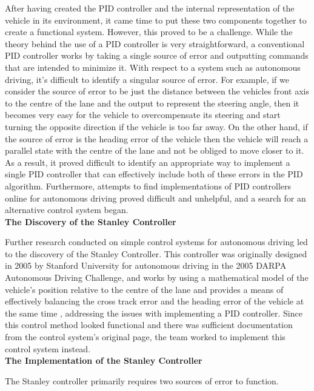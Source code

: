 \documentclass[titlepage, draft]{article}
\begin{document}
{After having created the PID controller and the internal representation of the vehicle in its environment, it came time to put these two components together to create a functional system. However, this proved to be a challenge. While the theory behind the use of a PID controller is very straightforward, a conventional PID controller works by taking a single source of error and outputting commands that are intended to minimize it. With respect to a system such as autonomous driving, it's difficult to identify a singular source of error. For example, if we consider the source of error to be just the distance between the vehicles front axis to the centre of the lane and the output to represent the steering angle, then it becomes very easy for the vehicle to overcompensate its steering and start turning the opposite direction if the vehicle is too far away. On the other hand, if the source of error is the heading error of the vehicle then the vehicle will reach a parallel state with the centre of the lane and not be obliged to move closer to it. As a result, it proved difficult to identify an appropriate way to implement a single PID controller that can effectively include both of these errors in the PID algorithm. Furthermore, attempts to find implementations of PID controllers online for autonomous driving proved difficult and unhelpful, and a search for an alternative control system began.
\\

\textbf{The Discovery of the Stanley Controller}

Further research conducted on simple control systems for autonomous driving led to the discovery of the Stanley Controller. This controller was originally designed in 2005 by Stanford University for autonomous driving in the 2005 DARPA Autonomous Driving Challenge, and works by using a mathematical model of the vehicle's position relative to the centre of the lane and provides a means of effectively balancing the cross track error and the heading error of the vehicle at the same time \cite{4282788}, addressing the issues with implementing a PID controller. Since this control method looked functional and there was sufficient documentation from the control system's original page, the team worked to implement this control system instead.
\\

\textbf{The Implementation of the Stanley Controller}

The Stanley controller primarily requires two sources of error to function.

}
\end{document}
